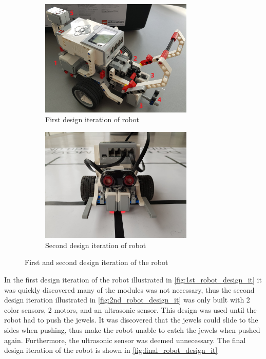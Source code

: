 \documentclass[../report.tex]{subfiles}
\begin{document}
\begin{figure}[H]
    \centering
    \begin{subfigure}[t]{0.48\textwidth}
        \centering
        \includegraphics[width=0.8\textwidth]{figures/old_robot_design/robot_design_side.jpg}
        \caption{First design iteration of robot}
        \label{fig:1st_robot_design_it}
    \end{subfigure}
    \hfill
    \begin{subfigure}[t]{0.48\textwidth}
        \centering
        \includegraphics[width=0.8\textwidth]{figures/old_robot_design/color_sensor_linefollower.jpg}
        \caption{Second design iteration of robot}
        \label{fig:2nd_robot_design_it}
    \end{subfigure}
    \caption{First and second design iteration of the robot}
    \label{fig:1st_2nd_robot_design_it}
\end{figure}

In the first design iteration of the robot illustrated in \autoref{fig:1st_robot_design_it} it was quickly discovered many of the modules was not necessary, thus the second design iteration illustrated in \autoref{fig:2nd_robot_design_it} was only built with 2 color sensors, 2 motors, and an ultrasonic sensor. This design was used until the robot had to push the jewels. It was discovered that the jewels could slide to the sides when pushing, thus make the robot unable to catch the jewels when pushed again. Furthermore, the ultrasonic sensor was deemed unnecessary. The final design iteration of the robot is shown in \autoref{fig:final_robot_design_it}
\end{document}

